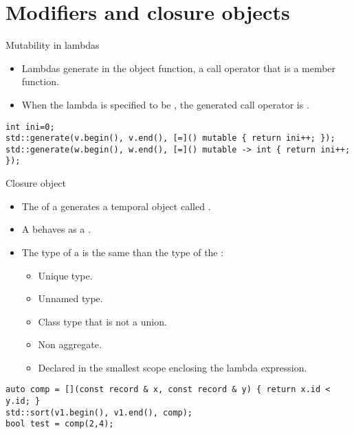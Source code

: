 \section{Modifiers and closure objects}

\begin{frame}[t,fragile]{Mutability in lambdas}
  \begin{itemize}
    \item Lambdas generate in the object function, 
          a call operator that is a  member function.
    \item When the lambda is specified to be ,
          the generated call operator is .
  \end{itemize}
\begin{lstlisting}
int ini=0;
std::generate(v.begin(), v.end(), [=]() mutable { return ini++; });
std::generate(w.begin(), w.end(), [=]() mutable -> int { return ini++; });
\end{lstlisting}
\end{frame}

\begin{frame}[t,fragile]{Closure object}
  \begin{itemize}
    \item The  of a  
          generates a temporal object called .
    \item A  behaves as a .
    \item The type of a  is the same
          than the type of the :
      \begin{itemize}
        \item Unique type.
        \item Unnamed type.
        \item Class type that is not a union.
        \item Non aggregate.
        \item Declared in the smallest scope enclosing the lambda expression.
      \end{itemize}
  \end{itemize}
\begin{lstlisting}
auto comp = [](const record & x, const record & y) { return x.id < y.id; }
std::sort(v1.begin(), v1.end(), comp);
bool test = comp(2,4);
\end{lstlisting}
\end{frame}

